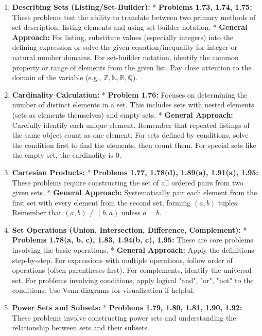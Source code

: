 \documentclass{article}
\begin{document}
\begin{itemize}
\begin{itemize}
\begin{itemize}
\begin{enumerate}
    \item \textbf{Describing Sets (Listing/Set-Builder):}
        *   \textbf{Problems 1.73, 1.74, 1.75:} These problems test the ability to translate between two primary methods of set description: listing elements and using set-builder notation.
        *   \textbf{General Approach:} For listing, substitute values (especially integers) into the defining expression or solve the given equation/inequality for integer or natural number domains. For set-builder notation, identify the common property or range of elements from the given list. Pay close attention to the domain of the variable (e.g., $\mathbb{Z}, \mathbb{N}, \mathbb{R}, \mathbb{Q}$).
    \item \textbf{Cardinality Calculation:}
        *   \textbf{Problem 1.76:} Focuses on determining the number of distinct elements in a set. This includes sets with nested elements (sets as elements themselves) and empty sets.
        *   \textbf{General Approach:} Carefully identify each unique element. Remember that repeated listings of the same object count as one element. For sets defined by conditions, solve the condition first to find the elements, then count them. For special sets like the empty set, the cardinality is 0.
    \item \textbf{Cartesian Products:}
        *   \textbf{Problems 1.77, 1.78(d), 1.89(a), 1.91(a), 1.95:} These problems require constructing the set of all ordered pairs from two given sets.
        *   \textbf{General Approach:} Systematically pair each element from the first set with every element from the second set, forming $(a,b)$ tuples. Remember that $(a,b) \neq (b,a)$ unless $a=b$.
    \item \textbf{Set Operations (Union, Intersection, Difference, Complement):}
        *   \textbf{Problems 1.78(a, b, c), 1.83, 1.94(b, c), 1.95:} These are core problems involving the basic operations.
        *   \textbf{General Approach:} Apply the definitions step-by-step. For expressions with multiple operations, follow order of operations (often parentheses first). For complements, identify the universal set. For problems involving conditions, apply logical "and", "or", "not" to the conditions. Use Venn diagrams for visualization if helpful.
    \item \textbf{Power Sets and Subsets:}
        *   \textbf{Problems 1.79, 1.80, 1.81, 1.90, 1.92:} These problems involve constructing power sets and understanding the relationship between sets and their subsets.

\end{enumerate}
\end{itemize}
\end{itemize}
\end{itemize}
\end{document}
